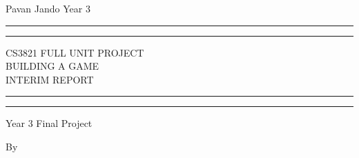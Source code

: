 \documentclass[a4paper]{report}
\begin{document}
 

\begin{titlepage} %
	
	Pavan Jando Year 3
	
	\centering %
	
	\scshape %
	
	\vspace*{\baselineskip} %
	
	
	\rule{\textwidth}{1.6pt}\vspace*{-\baselineskip}\vspace*{2pt} %
	\rule{\textwidth}{0.4pt} %
	
	\vspace{0.75\baselineskip} %
	
	{\LARGE CS3821 FULL UNIT PROJECT\\BUILDING A GAME\\INTERIM REPORT\\} %
	
	\vspace{0.75\baselineskip} %
	
	\rule{\textwidth}{0.4pt}\vspace*{-\baselineskip}\vspace{3.2pt} %
	\rule{\textwidth}{1.6pt} %
	
	\vspace{2\baselineskip} %
	
	
	Year 3 Final Project %
	
	\vspace*{3\baselineskip} %
	
	
	By
	 			
	\vspace{0.5\baselineskip} %
	

\end{titlepage}
\end{document}
